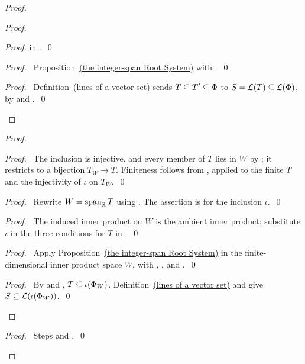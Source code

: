 \begin{mergedproofsection}
\begin{proof}
\begin{proof}
\begin{proof}
 in .~\qed\end{proof}
 \begin{proof}\pf\ Proposition~\hyperref[prop:312-rootset]{(the integer-span Root System)} with
 .~\qed\end{proof}
 \qedstep
 \begin{proof}\pf\ Definition~\hyperref[def:312-root-lines]{(lines of a vector set)} sends
 $T\subseteq T'\subseteq\Phi$ to $S={\mathcal L}(T)\subseteq{\mathcal L}(\Phi)$, by
  and .~\qed\end{proof}
\end{proof}
\begin{proof}
 \begin{proof}\pf\ The inclusion is injective, and every member of
 $T$ lies in $W$ by ; it restricts to a
 bijection $T_W\to T$. Finiteness follows from
 , applied to the finite $T$ and the
 injectivity of $\iota$ on $T_W$.~\qed\end{proof}
 \begin{proof}\pf\ Rewrite $W=\mathop{\mathrm{span}}\nolimits_{{\mathbb R}}T$ using
 . The assertion is
  for the inclusion $\iota$.~\qed\end{proof}
 \begin{proof}\pf\ The induced inner product on $W$ is the ambient
 inner product; substitute $\iota$ in the three conditions for $T$
 in .~\qed\end{proof}
 \begin{proof}\pf\ Apply Proposition~\hyperref[prop:312-rootset]{(the integer-span Root System)} in the
 finite-dimensional inner product space $W$, with
 , , and
 .~\qed\end{proof}
 \qedstep
 \begin{proof}\pf\ By  and
 , $T\subseteq\iota(\Phi_W)$.
 Definition~\hyperref[def:312-root-lines]{(lines of a vector set)} and 
 give $S\subseteq{\mathcal L}(\iota(\Phi_W))$.~\qed\end{proof}
\end{proof}
\qedstep
\begin{proof}\pf\ Steps  and .~\qed\end{proof}
\end{proof}


\end{mergedproofsection}
